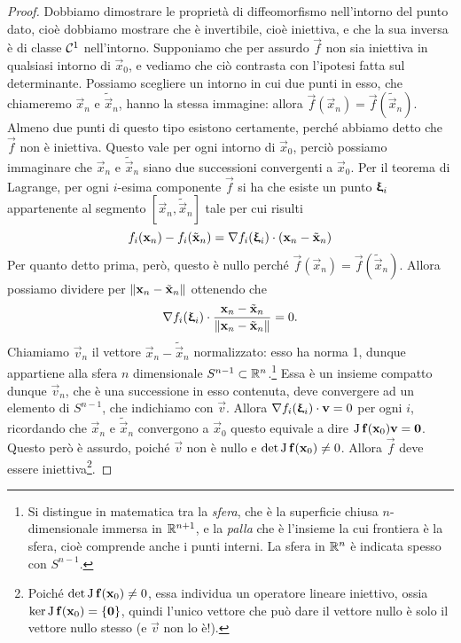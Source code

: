 \begin{proof}
	Dobbiamo dimostrare le proprietà di diffeomorfismo nell'intorno del punto dato, cioè dobbiamo mostrare che è invertibile, cioè iniettiva, e che la sua inversa è di classe $\mathcal{C}^{{1}}$ nell'intorno.
	Supponiamo che per assurdo $\vec f$ non sia iniettiva in qualsiasi intorno di $\vec x_0$, e vediamo che ciò contrasta con l'ipotesi fatta sul determinante.
	Possiamo scegliere un intorno in cui due punti in esso, che chiameremo $\vec x_n$ e $\tilde{\vec x}_n$, hanno la stessa immagine: allora $\vec f(\vec x_n)=\vec f(\tilde{\vec x}_n)$.
	Almeno due punti di questo tipo esistono certamente, perch\'e abbiamo detto che $\vec f$ non è iniettiva.
	Questo vale per ogni intorno di $\vec x_0$, perciò possiamo immaginare che $\vec x_n$ e $\tilde{\vec x}_n$ siano due successioni convergenti a $\vec x_0$.
	Per il teorema di Lagrange, per ogni $i$-esima componente $\vec f$ si ha che esiste un punto $\bm{\upxi}_i$ appartenente al segmento $[\vec x_n, \tilde{\vec x}_n]$ tale per cui risulti
	\begin{equation}
		f_i(\mathbf{x}_n)-f_i(\tilde{\mathbf{x}}_n)={\nabla f_i(\bm{\upxi}_i)}\cdot{(\mathbf{x}_n-\tilde{\mathbf{x}}_n)}
		\label{eq:lagrange-in-diffeomorfismo-locale}
	\end{equation}
	Per quanto detto prima, però, questo è nullo perché $\vec f(\vec x_n)=\vec f(\tilde{\vec x}_n)$.
	Allora possiamo dividere per $\left\|{\mathbf{x}_n-\tilde{\mathbf{x}}_n}\right\|$ ottenendo che
	\begin{equation}
		{\nabla f_i(\bm{\upxi}_i)}\cdot{\frac{\mathbf{x}_n-\tilde{\mathbf{x}}_n}{\left\|{\mathbf{x}_n-\tilde{\mathbf{x}}_n}\right\|}}=0.
		\label{eq:vettori-ortogonali-diffeomorfismo}
	\end{equation}
	Chiamiamo $\vec v_n$ il vettore $\vec x_n-\tilde{\vec x}_n$ normalizzato: esso ha norma 1, dunque appartiene alla sfera $n$ dimensionale $S^{n-1}\subset\mathbb{R}^n$.\footnote{Si distingue in matematica tra la \emph{sfera}, che è la superficie chiusa $n$-dimensionale immersa in $\mathbb{R}^{n+1}$, e la \emph{palla} che è l'insieme la cui frontiera è la sfera, cioè comprende anche i punti interni. La sfera in $\mathbb{R}^n$ è indicata spesso con $S^{n-1}$.}
	Essa è un insieme compatto dunque $\vec v_n$, che è una successione in esso contenuta, deve convergere ad un elemento di $S^{n-1}$, che indichiamo con $\vec v$.
	Allora ${\nabla f_i(\bm{\upxi}_i)}\cdot{\mathbf{v}}=0$ per ogni $i$, ricordando che $\vec x_n$ e $\tilde{\vec x}_n$ convergono a $\vec x_0$ questo equivale a dire $\operatorname{J}\mathbf{f}(\mathbf{x}_0)\mathbf{v}=\mathbf{0}$.
	Questo però è assurdo, poiché $\vec v$ non è nullo e $\det\operatorname{J}\mathbf{f}(\mathbf{x}_0)\neq 0$.
	Allora $\vec f$ deve essere iniettiva\footnote{Poiché $\det\operatorname{J}\mathbf{f}(\mathbf{x}_0)\neq 0$, essa individua un operatore lineare iniettivo, ossia $\ker\operatorname{J}\mathbf{f}(\mathbf{x}_0)=\{\mathbf{0}\}$, quindi l'unico vettore che può dare il vettore nullo è solo il vettore nullo stesso (e $\vec v$ non lo è!).}.


\end{proof}
